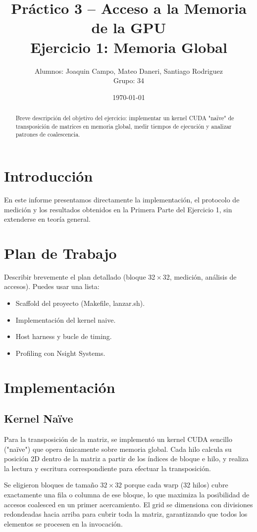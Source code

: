 \documentclass[a4paper,11pt]{article}
\title{Práctico 3 -- Acceso a la Memoria de la GPU\\Ejercicio 1: Memoria Global}
\author{Alumnos: Joaquin Campo, Mateo Daneri, Santiago Rodriguez \\ Grupo: 34}
\date{\today}
\begin{document}
\maketitle

\begin{abstract}
Breve descripción del objetivo del ejercicio: implementar un kernel CUDA "naïve" de transposición de matrices en memoria global, medir tiempos de ejecución y analizar patrones de coalescencia.
\end{abstract}

\section{Introducción}
En este informe presentamos directamente la implementación, el protocolo de medición y los resultados obtenidos en la Primera Parte del Ejercicio 1, sin extenderse en teoría general.

\section{Plan de Trabajo}
Describir brevemente el plan detallado (bloque 32\,$\times$\,32, medición, análisis de accesos). Puedes usar una lista:
\begin{itemize}
  \item Scaffold del proyecto (Makefile, lanzar.sh).
  \item Implementación del kernel naive.
  \item Host harness y bucle de timing.
  \item Profiling con Nsight Systems.
\end{itemize}

\section{Implementación}
\subsection{Kernel Naïve}
Para la transposición de la matriz, se implementó un kernel CUDA sencillo ("naïve") que opera únicamente sobre memoria global. Cada hilo calcula su posición 2D dentro de la matriz a partir de los índices de bloque e hilo, y realiza la lectura y escritura correspondiente para efectuar la transposición.

Se eligieron bloques de tamaño $32\times32$ porque cada warp (32 hilos) cubre exactamente una fila o columna de ese bloque, lo que maximiza la posibilidad de accesos coalesced en un primer acercamiento. El grid se dimensiona con divisiones redondeadas hacia arriba para cubrir toda la matriz, garantizando que todos los elementos se procesen en la invocación.
\end{document}
